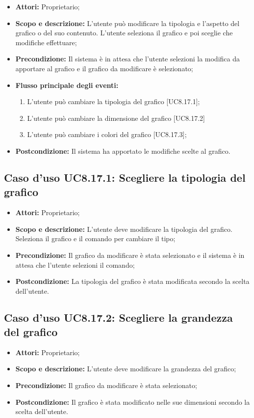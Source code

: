 \begin{itemize}
	\item \textbf{Attori:} Proprietario;
	\item \textbf{Scopo e descrizione:} L'utente può modificare la tipologia e l'aspetto del grafico o del suo contenuto. L'utente seleziona il grafico e poi sceglie che modifiche effettuare;
	\item \textbf{Precondizione:} Il sistema è in attesa che l'utente selezioni la modifica da apportare al grafico e il grafico da modificare è selezionato;
	\item \textbf{Flusso principale degli eventi:}
	\begin{enumerate}
		\item L'utente può cambiare la tipologia del grafico [UC8.17.1];
		\item L'utente può cambiare la dimensione del grafico [UC8.17.2]
		\item L'utente può cambiare i colori del grafico [UC8.17.3];
	\end{enumerate}
	\item \textbf{Postcondizione:} Il sistema ha apportato le modifiche scelte al grafico.
\end{itemize}

\subsection{Caso d'uso UC8.17.1: Scegliere la tipologia del grafico}
\begin{itemize}
	\item \textbf{Attori:} Proprietario;
	\item \textbf{Scopo e descrizione:} L'utente deve modificare la tipologia del grafico. Seleziona il grafico e il comando per cambiare il tipo;
	\item \textbf{Precondizione:} Il grafico da modificare è stata selezionato e il sistema è in attesa che l'utente selezioni il comando;
	\item \textbf{Postcondizione:} La tipologia del grafico è stata modificata secondo la scelta dell'utente.
\end{itemize}

\subsection{Caso d'uso UC8.17.2: Scegliere la grandezza del grafico}
\begin{itemize}
	\item \textbf{Attori:} Proprietario;
	\item \textbf{Scopo e descrizione:} L'utente deve modificare la grandezza del grafico;
	\item \textbf{Precondizione:} Il grafico da modificare è stata selezionato;
	\item \textbf{Postcondizione:} Il grafico è stata modificato nelle sue dimensioni secondo la scelta dell'utente.
\end{itemize}

